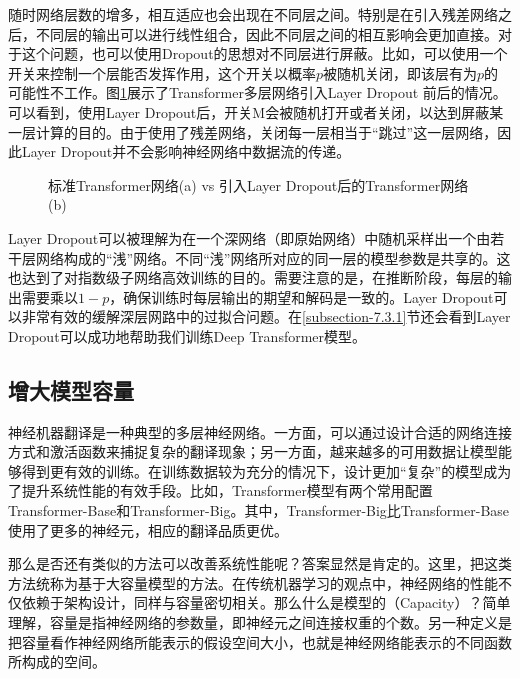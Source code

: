 \parinterval 随时网络层数的增多，相互适应也会出现在不同层之间。特别是在引入残差网络之后，不同层的输出可以进行线性组合，因此不同层之间的相互影响会更加直接。对于这个问题，也可以使用Dropout的思想对不同层进行屏蔽。比如，可以使用一个开关来控制一个层能否发挥作用，这个开关以概率$p$被随机关闭，即该层有为$p$的可能性不工作。图\ref{fig:7-15}展示了Transformer多层网络引入Layer Dropout 前后的情况。可以看到，使用Layer Dropout后，开关M会被随机打开或者关闭，以达到屏蔽某一层计算的目的。由于使用了残差网络，关闭每一层相当于``跳过''这一层网络，因此Layer Dropout并不会影响神经网络中数据流的传递。

\begin{figure}[htp]
\centering

\caption{标准Transformer网络(a)  vs 引入Layer Dropout后的Transformer网络(b)}
\label{fig:7-15}
\end{figure}

\parinterval Layer Dropout可以被理解为在一个深网络（即原始网络）中随机采样出一个由若干层网络构成的``浅''网络。不同``浅''网络所对应的同一层的模型参数是共享的。这也达到了对指数级子网络高效训练的目的。需要注意的是，在推断阶段，每层的输出需要乘以$1-p$，确保训练时每层输出的期望和解码是一致的。Layer Dropout可以非常有效的缓解深层网路中的过拟合问题。在\ref{subsection-7.3.1}节还会看到Layer Dropout可以成功地帮助我们训练Deep Transformer模型。


\subsection{增大模型容量}
\label{subsection-7.3.2}

\parinterval 神经机器翻译是一种典型的多层神经网络。一方面，可以通过设计合适的网络连接方式和激活函数来捕捉复杂的翻译现象；另一方面，越来越多的可用数据让模型能够得到更有效的训练。在训练数据较为充分的情况下，设计更加``复杂''的模型成为了提升系统性能的有效手段。比如，Transformer模型有两个常用配置Transformer-Base和Transformer-Big。其中，Transformer-Big比Transformer-Base使用了更多的神经元，相应的翻译品质更优\cite{NIPS2017_7181}。

\parinterval 那么是否还有类似的方法可以改善系统性能呢？答案显然是肯定的。这里，把这类方法统称为基于大容量模型的方法。在传统机器学习的观点中，神经网络的性能不仅依赖于架构设计，同样与容量密切相关。那么什么是模型的{\small{}}（Capacity）？简单理解，容量是指神经网络的参数量，即神经元之间连接权重的个数。另一种定义是把容量看作神经网络所能表示的假设空间大小\cite{DBLP:journals/nature/LeCunBH15}，也就是神经网络能表示的不同函数所构成的空间。


